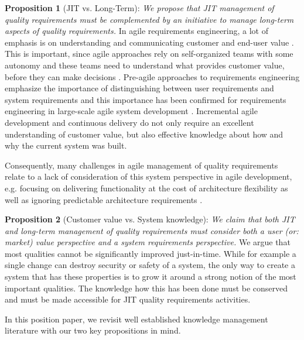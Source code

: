 \textbf{Proposition 1} (JIT vs. Long-Term): \emph{We propose that JIT management of quality requirements must be complemented by an initiative to manage long-term aspects of quality requirements.}
%
%
In agile requirements engineering, a lot of emphasis is on understanding and communicating customer and end-user value \cite{Alahyari2016}.
This is important, since agile approaches rely on self-organized teams with some autonomy \cite{Meyer2014} and these teams need to understand what provides customer value, before they can make decisions \cite{Kasauli2017}.
Pre-agile approaches to requirements engineering emphasize the importance of distinguishing between user requirements and system requirements \cite{Sommerville2006} and this importance has been confirmed for requirements engineering in large-scale agile system development \cite{Kasauli2017a}. Incremental agile development and continuous delivery do not only require an excellent understanding of customer value, but also effective knowledge about how and why the current system was built. 

Consequently, many challenges in agile management of quality requirements relate to a lack of consideration of this system perspective in agile development, e.g. %
{focusing on delivering functionality at the cost of architecture flexibility} as well as %
{ignoring predictable architecture requirements} \cite{Alsaqaf2017}. 

\textbf{Proposition 2} (Customer value vs. System knowledge): \emph{ We claim that both JIT and long-term management of quality requirements must consider both a user (or: market) value perspective and a system requirements perspective.}
%
We argue that most qualities cannot be significantly improved just-in-time. 
While for example a single change can destroy security or safety of a system, the only way to create a system that has these properties is to grow it around a strong notion of the most important qualities. 
The knowledge how this has been done must be conserved and must be made accessible for JIT quality requirements activities.

In this position paper, we revisit well established knowledge management literature with our two key propositions in mind.
 


